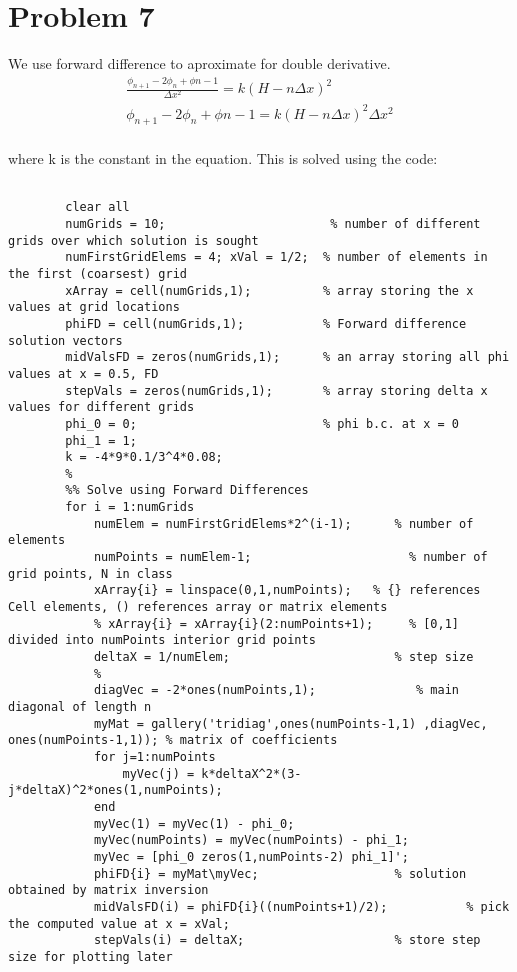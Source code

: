 \documentclass{article}
\begin{document}
    \section{Problem 7}
    We use forward difference to aproximate for double derivative.\\
    \begin{align}
        \frac{\phi_{n+1}-2\phi_{n}+\phi{n-1}}{\Delta x^2} = k(H - n\Delta x)^2\\
        \phi_{n+1}-2\phi_{n}+\phi{n-1} = k(H - n\Delta x)^2\Delta x^2
    \end{align}\\
    where k is the constant in the equation.
    This is solved using the code:\\
    \begin{lstlisting}
 
        clear all
        numGrids = 10;                       % number of different grids over which solution is sought
        numFirstGridElems = 4; xVal = 1/2;  % number of elements in the first (coarsest) grid
        xArray = cell(numGrids,1);          % array storing the x values at grid locations
        phiFD = cell(numGrids,1);           % Forward difference solution vectors
        midValsFD = zeros(numGrids,1);      % an array storing all phi values at x = 0.5, FD
        stepVals = zeros(numGrids,1);       % array storing delta x values for different grids
        phi_0 = 0;                          % phi b.c. at x = 0
        phi_1 = 1;
        k = -4*9*0.1/3^4*0.08;
        %
        %% Solve using Forward Differences
        for i = 1:numGrids
            numElem = numFirstGridElems*2^(i-1);      % number of elements
            numPoints = numElem-1;                      % number of  grid points, N in class
            xArray{i} = linspace(0,1,numPoints);   % {} references Cell elements, () references array or matrix elements
            % xArray{i} = xArray{i}(2:numPoints+1);     % [0,1] divided into numPoints interior grid points
            deltaX = 1/numElem;                       % step size
            %
            diagVec = -2*ones(numPoints,1);              % main diagonal of length n
            myMat = gallery('tridiag',ones(numPoints-1,1) ,diagVec, ones(numPoints-1,1)); % matrix of coefficients
            for j=1:numPoints
                myVec(j) = k*deltaX^2*(3-j*deltaX)^2*ones(1,numPoints);
            end
            myVec(1) = myVec(1) - phi_0;
            myVec(numPoints) = myVec(numPoints) - phi_1;
            myVec = [phi_0 zeros(1,numPoints-2) phi_1]';
            phiFD{i} = myMat\myVec;                   % solution obtained by matrix inversion
            midValsFD(i) = phiFD{i}((numPoints+1)/2);           % pick the computed value at x = xVal; 
            stepVals(i) = deltaX;                     % store step size for plotting later


\end{lstlisting}
\end{document}
